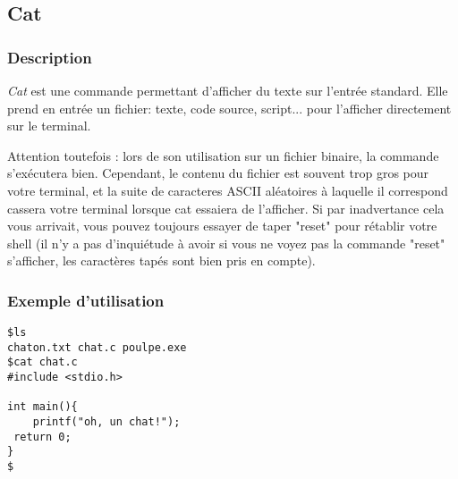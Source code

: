\subsection{Cat}
\subsubsection{Description}
\emph{Cat} est une commande permettant d'afficher du texte sur l'entrée standard.
Elle prend en entrée un fichier: texte, code source, script... pour l'afficher directement sur le terminal.

Attention toutefois : lors de son utilisation sur un fichier binaire, la commande s'exécutera bien. Cependant, le contenu du fichier est souvent trop gros pour votre terminal, et la suite de caracteres ASCII aléatoires à laquelle il correspond cassera votre terminal lorsque cat essaiera de l'afficher.
Si par inadvertance cela vous arrivait, vous pouvez toujours essayer de taper "reset" pour rétablir votre shell (il n'y a pas d'inquiétude à avoir si vous ne voyez pas la commande "reset" s'afficher, les caractères tapés sont bien pris en compte).


\subsubsection{Exemple d'utilisation}

\begin{lstlisting}
$ls
chaton.txt chat.c poulpe.exe
$cat chat.c
#include <stdio.h>

int main(){
	printf("oh, un chat!");
 return 0;
}
$
\end{lstlisting}
